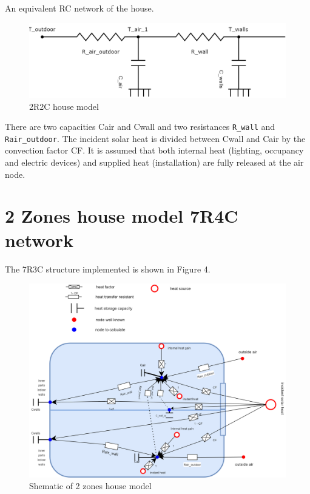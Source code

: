 \documentclass[a4paper,10pt]{article}
\begin{document}
An equivalent RC network of the house.

\begin{figure}[H]
	\centering
	\includegraphics[width=1.0\columnwidth]{Pictures/2R2C_Model.png}
	\caption[Short title]{2R2C house model}
	\label{row house}
	\end{figure}
	
There are two capacities Cair and Cwall and two resistances \texttt{R\_wall} and \texttt{Rair\_outdoor}. The incident solar heat is divided between Cwall and Cair by the convection factor CF. It is assumed that both internal heat (lighting, occupancy and electric devices) and supplied heat (installation) are fully released at the air node. 



\section{2 Zones house model 7R4C network}

The 7R3C structure implemented is shown in Figure 4.
	
\begin{figure}[H]
	\centering
	\includegraphics[width=1.0\columnwidth]{Pictures/House_electrical_circuits overview.png}
	\caption[Short title]{Shematic of 2 zones house model}
	\label{row house}
	\end{figure} 
	
\end{document}
